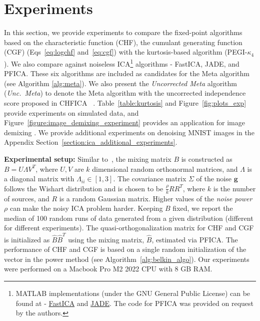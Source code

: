 \documentclass[letterpaper]{article}
\newcommand{\bg}{\pmb{g}}
\begin{document}
\section{Experiments}
\label{section:experiments}
In this section, we provide experiments to compare the fixed-point algorithms based on the characteristic function (CHF), the cumulant generating function (CGF) (Eqs~\ref{eq:logchf} and~\ref{eq:cgf}) with the kurtosis-based algorithm (PEGI-$\kappa_{4}$ \cite{NIPS2015_89f03f7d}). We also compare against noiseless ICA\footnote{MATLAB implementations (under the GNU General Public License) can be found at - \href{https://research.ics.aalto.fi/ica/fastica/}{FastICA} and \href{https://github.com/ruohoruotsi/Riddim/blob/master/MATLAB/jade.m}{JADE}. The code for PFICA was provided on request by the authors.} algorithms - FastICA, JADE, and PFICA. These six algorithms are included as candidates for the Meta algorithm (see Algorithm \ref{alg:meta}). We also present the \textit{Uncorrected Meta} algorithm (\textit{Unc.\ Meta}) to denote the Meta algorithm with the uncorrected independence score proposed in CHFICA ~\cite{ERIKSSON20032195}. Table~\ref{table:kurtosis} and Figure~\ref{fig:plots_exp} provide experiments on simulated data, and Figure~\ref{figure:image_demixing_experiment} provides an application for image demixing \cite{deVito_ICA_for_demixing_images}. We provide additional experiments on denoising MNIST images in the Appendix Section~\ref{section:ica_additional_experiments}.

\textbf{Experimental setup:}
Similar to~\cite{NIPS2015_89f03f7d}, the mixing matrix $B$ is constructed as $B = U\Lambda V^{T}$, where $U,V$ are $k$ dimensional random orthonormal matrices, and $\Lambda$ is a diagonal matrix with $\Lambda_{ii}\in[1,3]$. The covariance matrix $\Sigma$ of the noise $\bg$ follows the Wishart distribution and is chosen to be $ \frac{\rho}{k} RR^{T}$, where $k$ is the number of sources, and $R$ is a random Gaussian matrix. Higher values of the \textit{noise power} $\rho$ can make the noisy ICA problem harder. Keeping $B$ fixed, we report the median of 100 random runs of data generated from a given distribution (different for different experiments). The quasi-orthogonalization matrix for CHF and CGF is initialized as $\hat{B}\hat{B}^T$ using the mixing matrix, $\hat{B}$, estimated via PFICA. The performance of CHF and CGF is based on a single random initialization of the vector in the power method (see Algorithm~\ref{alg:belkin_algo}). Our experiments were performed on a Macbook Pro M2 2022 CPU with 8 GB RAM.
\end{document}
